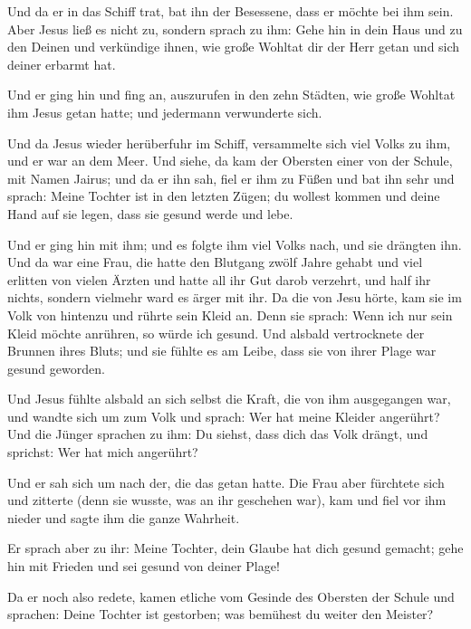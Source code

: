  Und da er in das Schiff trat, bat ihn der Besessene,
dass er möchte bei ihm sein.  Aber Jesus ließ es nicht
zu, sondern sprach zu ihm: Gehe hin in dein Haus und zu den Deinen und
verkündige ihnen, wie große Wohltat dir der Herr getan und sich deiner
erbarmt hat.

 Und er ging hin und fing an, auszurufen in den zehn
Städten, wie große Wohltat ihm Jesus getan hatte; und jedermann
verwunderte sich.

 Und da Jesus wieder herüberfuhr im Schiff, versammelte
sich viel Volks zu ihm, und er war an dem Meer.  Und
siehe, da kam der Obersten einer von der Schule, mit Namen Jairus; und
da er ihn sah, fiel er ihm zu Füßen  und bat ihn sehr und
sprach: Meine Tochter ist in den letzten Zügen; du wollest kommen und
deine Hand auf sie legen, dass sie gesund werde und lebe.

 Und er ging hin mit ihm; und es folgte ihm viel Volks
nach, und sie drängten ihn.  Und da war eine Frau, die
hatte den Blutgang zwölf Jahre gehabt  und viel erlitten
von vielen Ärzten und hatte all ihr Gut darob verzehrt, und half ihr
nichts, sondern vielmehr ward es ärger mit ihr.  Da die
von Jesu hörte, kam sie im Volk von hintenzu und rührte sein Kleid an.
 Denn sie sprach: Wenn ich nur sein Kleid möchte
anrühren, so würde ich gesund.  Und alsbald vertrocknete
der Brunnen ihres Bluts; und sie fühlte es am Leibe, dass sie von ihrer
Plage war gesund geworden.

 Und Jesus fühlte alsbald an sich selbst die Kraft, die
von ihm ausgegangen war, und wandte sich um zum Volk und sprach: Wer hat
meine Kleider angerührt?  Und die Jünger sprachen zu ihm:
Du siehst, dass dich das Volk drängt, und sprichst: Wer hat mich
angerührt?

 Und er sah sich um nach der, die das getan hatte.
 Die Frau aber fürchtete sich und zitterte (denn sie
wusste, was an ihr geschehen war), kam und fiel vor ihm nieder und sagte
ihm die ganze Wahrheit.

 Er sprach aber zu ihr: Meine Tochter, dein Glaube hat
dich gesund gemacht; gehe hin mit Frieden und sei gesund von deiner
Plage!

 Da er noch also redete, kamen etliche vom Gesinde des
Obersten der Schule und sprachen: Deine Tochter ist gestorben; was
bemühest du weiter den Meister?


